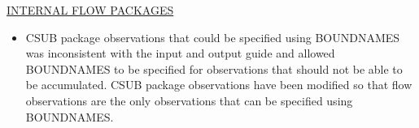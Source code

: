 \underline{INTERNAL FLOW PACKAGES}
\begin{itemize}
	\item CSUB package observations that could be specified using BOUNDNAMES was inconsistent with the input and output guide and allowed BOUNDNAMES to be specified for observations that should not be able to be accumulated. CSUB package observations have been modified so that flow observations are the only observations that can be specified using BOUNDNAMES.
\end{itemize}






